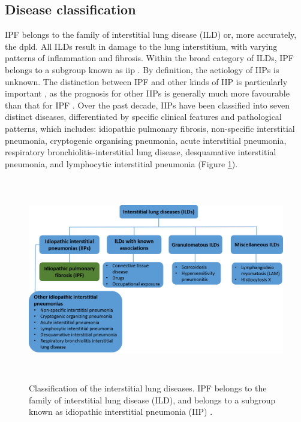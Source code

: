 \subsection{Disease classification} 
IPF belongs to the family of interstitial lung disease (ILD) or, more accurately, the \gls{dpld}. All ILDs result in damage to the lung interstitium, with varying patterns of inflammation and fibrosis. Within the broad category of ILDs, IPF belongs to a subgroup known as \gls{iip} \citep{meltzer2008idiopathic}. By definition, the aetiology of IIPs is unknown. The distinction between IPF and other kinds of IIP is particularly important \citep{corte2015idiopathic, troy2012management}, as the prognosis for other IIPs is generally much more favourable than that for IPF \citep{meltzer2008idiopathic}. Over the past decade, IIPs have been classified into seven distinct diseases, differentiated by specific clinical features and pathological patterns, which includes: idiopathic pulmonary fibrosis, non-specific interstitial pneumonia, cryptogenic organising pneumonia, acute interstitial pneumonia, respiratory bronchiolitis-interstitial lung disease, desquamative interstitial pneumonia, and lymphocytic interstitial pneumonia \citep{katzenstein1998idiopathic, troy2012management} (Figure \ref{fig:DiseaseClassification}).

\begin{figure}[htbp]
  \centering 
  \includegraphics[height=3.5in]{Background/Image/DiseaseClassification.png}
  \caption{Classification of the interstitial lung diseases. IPF belongs to the family of interstitial lung disease (ILD), and belongs to a subgroup known as idiopathic interstitial pneumonia (IIP) \citep{troy2012management}.}
  \label{fig:DiseaseClassification}
\end{figure}

